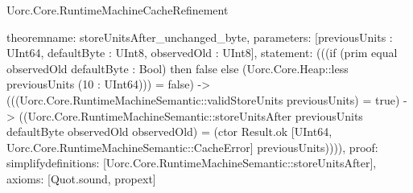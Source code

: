 \begin{lexlean}{Uorc.Core.RuntimeMachineCacheRefinement}
\begin{semanticmodule}
theorem{name: storeUnitsAfter_unchanged_byte, parameters: [previousUnits : UInt64, defaultByte : UInt8, observedOld : UInt8], statement: (((if (prim equal observedOld defaultByte : Bool) then false else (Uorc.Core.Heap::less previousUnits (10 : UInt64))) = false) -> (((Uorc.Core.RuntimeMachineSemantic::validStoreUnits previousUnits) = true) -> ((Uorc.Core.RuntimeMachineSemantic::storeUnitsAfter previousUnits defaultByte observedOld observedOld) = (ctor Result.ok [UInt64, Uorc.Core.RuntimeMachineSemantic::CacheError] previousUnits)))), proof: simplify{definitions: [Uorc.Core.RuntimeMachineSemantic::storeUnitsAfter]}, axioms: [Quot.sound, propext]}
\end{semanticmodule}
\end{lexlean}
